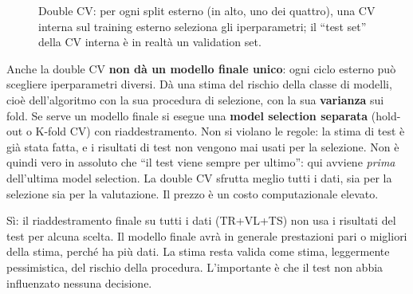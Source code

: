 \begin{figure}[ht]
\centering
{}
\caption{Double CV: per ogni split esterno (in alto, uno dei quattro), una CV interna sul training esterno
seleziona gli iperparametri; il ``test set'' della CV interna è in realtà un validation set.}
\label{fig:double-cv}
\end{figure}

Anche la double CV \textbf{non dà un modello finale unico}: ogni ciclo esterno può scegliere iperparametri
diversi. Dà una stima del rischio della classe di modelli, cioè dell'algoritmo con la sua procedura di selezione,
con la sua \textbf{varianza} sui fold. Se serve un modello finale si esegue una \textbf{model selection separata}
(hold-out o K-fold CV) con riaddestramento. Non si violano le regole: la stima di test è già stata fatta, e i
risultati di test non vengono mai usati per la selezione. Non è quindi vero in assoluto che ``il test viene
sempre per ultimo'': qui avviene \emph{prima} dell'ultima model selection. La double CV sfrutta meglio tutti i
dati, sia per la selezione sia per la valutazione. Il prezzo è un costo computazionale elevato.

\begin{idea}
Sì: il riaddestramento finale su tutti i dati (TR+VL+TS) non usa i risultati del test per alcuna scelta. Il
modello finale avrà in generale prestazioni pari o migliori della stima, perché ha più dati. La stima resta
valida come stima, leggermente pessimistica, del rischio della procedura. L'importante è che il test non abbia
influenzato nessuna decisione.
\end{idea}


